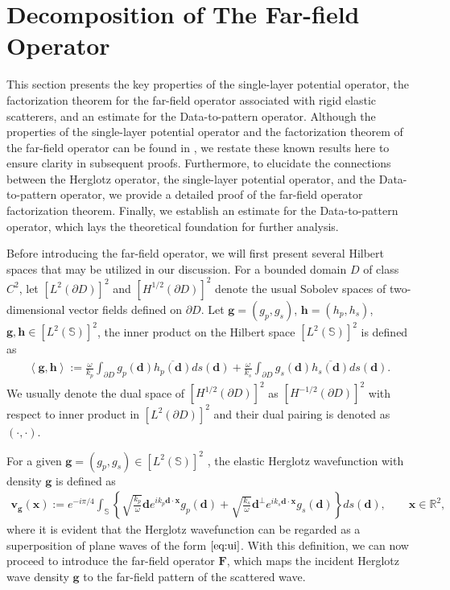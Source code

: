 \documentclass[11pt,reqno,twoside]{amsart}
\theoremstyle{definition}
\theoremstyle{remark}
\numberwithin{equation}{section}
\begin{document}
	
	\section{Decomposition of The Far-field Operator}\label{sec:far-field Operator decomposition}
	This section presents the key properties of the single-layer potential operator, the factorization theorem for the far-field operator associated with rigid elastic scatterers, and an estimate for the Data-to-pattern operator. Although the properties of the single-layer potential operator and the factorization theorem of the far-field operator can be found in \cite{Aren01}, we restate these known results here to ensure clarity in subsequent proofs. Furthermore, to elucidate the connections between the Herglotz operator, the single-layer potential operator, and the Data-to-pattern operator, we provide a detailed proof of the far-field operator factorization theorem. Finally, we establish an estimate for the Data-to-pattern operator, which lays the theoretical foundation for further analysis.
	
	Before introducing the far-field operator, we will first present several Hilbert spaces that may be utilized in our discussion. For a bounded domain $D$ of class $C^2$, let $\left[L^2\left(\partial D\right) \right] ^2$ and $\left[H^{1/2} \left(\partial D\right) \right] ^2$ denote the usual Sobolev spaces of two-dimensional vector fields defined on $\partial D$. Let $\mathbf{g}=\left( g_p,g_s\right)$, $\mathbf{h}=\left( h_p,h_s\right)$, $\mathbf{g},\mathbf{h} \in \left[L^2\left(\mathbb S\right) \right] ^2$, the inner product on the Hilbert space $\left[L^2\left(\mathbb S\right) \right] ^2$  is defined as
	\begin{align}\label{eq:InnerProduct}
		\left\langle \mathbf{g},\mathbf{h}\right\rangle := \frac{\omega}{k_p}\int_{\partial D} g_p(\mathbf d) \overline{h_p(\mathbf d)}ds(\mathbf d)+\frac{\omega}{k_s}\int_{\partial D} g_s(\mathbf d) \overline{h_s(\mathbf d)}ds(\mathbf d).
	\end{align}
	We usually denote the dual space of  $\left[H^{1/2}\left(\partial D\right) \right] ^2$ as  $\left[H^{-1/2}\left(\partial D\right) \right] ^2$ with respect to inner product in $\left[L^2\left(\partial D\right) \right] ^2$ and their dual pairing is denoted as $\left( \cdot,\cdot\right) $.
	
	For a given $\mathbf{g}=\left( g_p, g_s\right)  \in \left[L^2\left(\mathbb S\right) \right] ^2$ , the elastic Herglotz wavefunction with density $\mathbf{g}$ is defined as
	\begin{align}\label{eq:HorglotzWave}
		\mathbf{v_g}(\mathbf{x}):=e^{-i\pi /4} \int_{\mathbb S}  \left\lbrace \sqrt{\frac{k_p}{\omega}}\mathbf{d} e^{ik_p\mathbf{d}\cdot\mathbf{x}}g_p(\mathbf{d})+\sqrt{\frac{k_s}{\omega}}\mathbf{d}^{\perp} e^{ik_s\mathbf{d}\cdot\mathbf{x}}g_s(\mathbf{d})\right\rbrace ds(\mathbf{d}), \qquad \mathbf{x}\in\mathbb{R}^2,
	\end{align}
   where it is evident that the Herglotz wavefunction can be regarded as a superposition of plane waves of the form $\eqref{eq:ui}$. With this definition, we can now proceed to introduce the far-field operator $\mathbf{F}$, which maps the incident Herglotz wave density $\mathbf{g}$ to the far-field pattern of the scattered wave.
		
\end{document}
